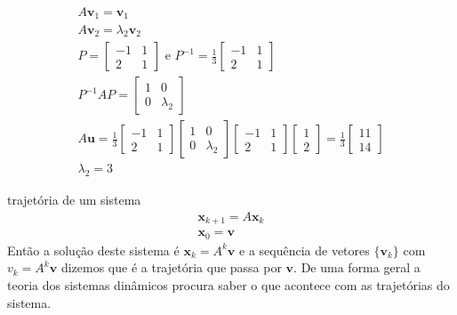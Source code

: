 \documentclass{beamer}
\begin{document}
\begin{frame}
  \begin{gather*}
    A\mathbf{v}_1 = \mathbf{v}_1 \\
    A\mathbf{v}_2 = \lambda_2\mathbf{v}_2\\
    P= \begin{bmatrix}
      -1 & 1 \\ 2 & 1
    \end{bmatrix}\text{ e } P^{-1}=\frac{1}{3}\begin{bmatrix}
      -1 & 1 \\ 2 & 1
    \end{bmatrix}  \\
    P^{-1}AP=\begin{bmatrix}
      1 & 0 \\ 0 & \lambda_2
    \end{bmatrix}\\
    A\mathbf{u}=
    \frac{1}{3} \begin{bmatrix}
      -1 & 1 \\ 2 & 1
    \end{bmatrix} \begin{bmatrix}
      1 & 0 \\ 0 & \lambda_2
    \end{bmatrix} \begin{bmatrix}
      -1 & 1 \\ 2 & 1
    \end{bmatrix}\begin{bmatrix}
      1 \\ 2
    \end{bmatrix} = \frac{1}{3}\begin{bmatrix}
      11 \\ 14
    \end{bmatrix} \\
    \lambda_2=3
  \end{gather*}
\end{frame}

\begin{frame}{trajetória de um sistema}
  \begin{gather*}
    \mathbf{x}_{k+1} =A\mathbf{x}_k \\
    \mathbf{x}_0 = \mathbf{v}
  \end{gather*}
  Então a solução deste sistema é $\mathbf{x}_k = A^k\mathbf{v}$ e a 
  sequência de vetores $\{\mathbf{v}_k\}$ com $v_k = A^k\mathbf{v}$ dizemos 
  que é a trajetória que passa por $\mathbf{v}$. De uma forma geral
  a teoria dos sistemas dinâmicos procura saber o que acontece
  com as trajetórias do sistema.
  
\end{frame}
\end{document}
